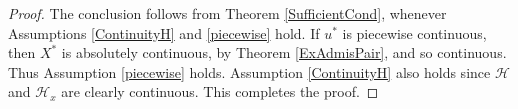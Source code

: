 \begin{proof} The conclusion follows from Theorem \ref{SufficientCond}, whenever Assumptions \ref{ContinuityH} and \ref{piecewise} hold. 
If $u^\ast$ is piecewise continuous, then $X^\ast$ is absolutely continuous, by Theorem \ref{ExAdmisPair}, and so continuous. Thus Assumption \ref{piecewise} holds. Assumption \ref{ContinuityH} also holds since $\mathcal{H}$ and $\mathcal{H}_x$ are clearly continuous. This completes the proof.
\end{proof}